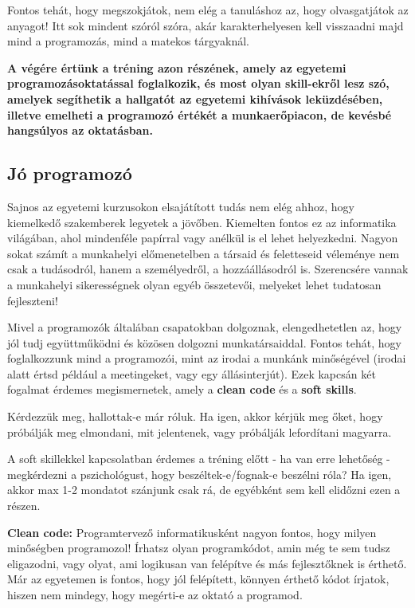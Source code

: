 \documentclass[../Main.tex]{subfiles}
\begin{document}
Fontos tehát, hogy megszokjátok, nem elég a tanuláshoz az, hogy olvasgatjátok az anyagot! Itt sok mindent szóról szóra, akár karakterhelyesen kell visszaadni majd mind a programozás, mind a matekos tárgyaknál.

\textbf{A végére értünk a tréning azon részének, amely az egyetemi programozásoktatással foglalkozik, és most olyan skill-ekről lesz szó, amelyek segíthetik a hallgatót az egyetemi kihívások leküzdésében, illetve emelheti a programozó értékét a munkaerőpiacon, de kevésbé hangsúlyos az oktatásban.}

\subsection{Jó programozó}

Sajnos az egyetemi kurzusokon elsajátított tudás nem elég ahhoz, hogy kiemelkedő szakemberek legyetek a jövőben.
Kiemelten fontos ez az informatika világában, ahol mindenféle papírral vagy anélkül is el lehet helyezkedni.
Nagyon sokat számít a munkahelyi előmenetelben a társaid és feletteseid véleménye nem csak a tudásodról, hanem a személyedről, a hozzáállásodról is.
Szerencsére vannak a munkahelyi sikerességnek olyan egyéb összetevői, melyeket lehet tudatosan fejleszteni!

Mivel a programozók általában csapatokban dolgoznak, elengedhetetlen az, hogy jól tudj együttműködni és közösen dolgozni munkatársaiddal.
Fontos tehát, hogy foglalkozzunk mind a programozói, mint az irodai a munkánk minőségével (irodai alatt értsd például a meetingeket, vagy egy állásinterjút).
Ezek kapcsán két fogalmat érdemes megismernetek, amely a \textbf{clean code} és a \textbf{soft skills}.

Kérdezzük meg, hallottak-e már róluk.
Ha igen, akkor kérjük meg őket, hogy próbálják meg elmondani, mit jelentenek, vagy próbálják lefordítani magyarra.

A soft skillekkel kapcsolatban érdemes a tréning előtt - ha van erre lehetőség - megkérdezni a pszichológust, hogy beszéltek-e/fognak-e beszélni róla? Ha igen, akkor max 1-2 mondatot szánjunk csak rá, de egyébként sem kell elidőzni ezen a részen.

\textbf{Clean code:}
Programtervező informatikusként nagyon fontos, hogy milyen minőségben programozol!
Írhatsz olyan programkódot, amin még te sem tudsz eligazodni, vagy olyat, ami logikusan van felépítve és más fejlesztőknek is érthető.
Már az egyetemen is fontos, hogy jól felépített, könnyen érthető kódot írjatok, hiszen nem mindegy, hogy megérti-e az oktató a programod.
\end{document}
